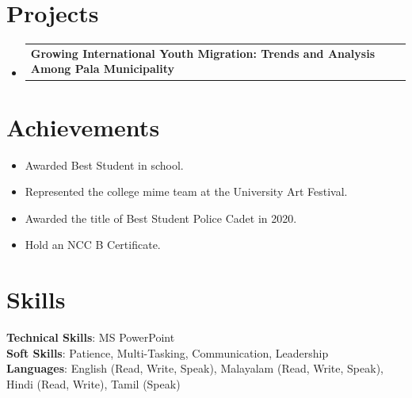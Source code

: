\documentclass[a4paper,11pt]{article}
\makeatletter
\newcommand{\resumeItem}[1]{
  \item\small{
    {#1 \vspace{-2pt}}
  }
}
\newcommand{\resumeProjectHeading}[2]{
    \item
    \begin{tabular*}{0.97\textwidth}{l@{\extracolsep{\fill}}r}
      \small\textbf{#1} & #2 \\
    \end{tabular*}\vspace{-7pt}
}
\newcommand{\resumeSubHeadingListStart}{\begin{itemize}[leftmargin=0.15in, label={}]}
\newcommand{\resumeSubHeadingListEnd}{\end{itemize}}
\newcommand{\resumeItemListStart}{\begin{itemize}}
\newcommand{\resumeItemListEnd}{\end{itemize}\vspace{-5pt}}
\makeatother
\begin{document}
\section{Projects}
    \resumeSubHeadingListStart
      \resumeProjectHeading
          {Growing International Youth Migration: Trends and Analysis Among Pala Municipality}{}
    \resumeSubHeadingListEnd

\section{Achievements}
  \resumeItemListStart
    \resumeItem{Awarded Best Student in school.}
    \resumeItem{Represented the college mime team at the University Art Festival.}
    \resumeItem{Awarded the title of Best Student Police Cadet in 2020.}
    \resumeItem{Hold an NCC B Certificate.}
  \resumeItemListEnd

\section{Skills}
 \begin{itemize}[leftmargin=0.15in, label={}]
    \small{\item{
     \textbf{Technical Skills}{: MS PowerPoint} \\
     \textbf{Soft Skills}{: Patience, Multi-Tasking, Communication, Leadership} \\
     \textbf{Languages}{: English (Read, Write, Speak), Malayalam (Read, Write, Speak), Hindi (Read, Write), Tamil (Speak)}
    }}
 \end{itemize}
\end{document}
